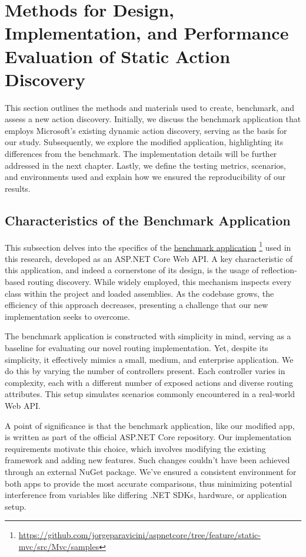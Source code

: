 \chapter{Methods for Design, Implementation, and Performance Evaluation of Static Action Discovery}

This section outlines the methods and materials used to create, benchmark, and assess a new action discovery. Initially, we discuss the benchmark application that employs Microsoft's existing dynamic action discovery, serving as the basis for our study. Subsequently, we explore the modified application, highlighting its differences from the benchmark. The implementation details will be further addressed in the next chapter. Lastly, we define the testing metrics, scenarios, and environments used and explain how we ensured the reproducibility of our results.


\section{Characteristics of the Benchmark Application}

This subsection delves into the specifics of the \href{https://github.com/jorgeparavicini/aspnetcore/tree/feature/static-mvc/src/Mvc/samples}{benchmark application} \footnote{\url{https://github.com/jorgeparavicini/aspnetcore/tree/feature/static-mvc/src/Mvc/samples}} used in this research, developed as an ASP.NET Core Web API. A key characteristic of this application, and indeed a cornerstone of its design, is the usage of reflection-based routing discovery. While widely employed, this mechanism inspects every class within the project and loaded assemblies. As the codebase grows, the efficiency of this approach decreases, presenting a challenge that our new implementation seeks to overcome.

The benchmark application is constructed with simplicity in mind, serving as a baseline for evaluating our novel routing implementation. Yet, despite its simplicity, it effectively mimics a small, medium, and enterprise application. We do this by varying the number of controllers present. Each controller varies in complexity, each with a different number of exposed actions and diverse routing attributes. This setup simulates scenarios commonly encountered in a real-world Web API.

A point of significance is that the benchmark application, like our modified app, is written as part of the official ASP.NET Core repository. Our implementation requirements motivate this choice, which involves modifying the existing framework and adding new features. Such changes couldn't have been achieved through an external NuGet package. We've ensured a consistent environment for both apps to provide the most accurate comparisons, thus minimizing potential interference from variables like differing .NET SDKs, hardware, or application setup.

